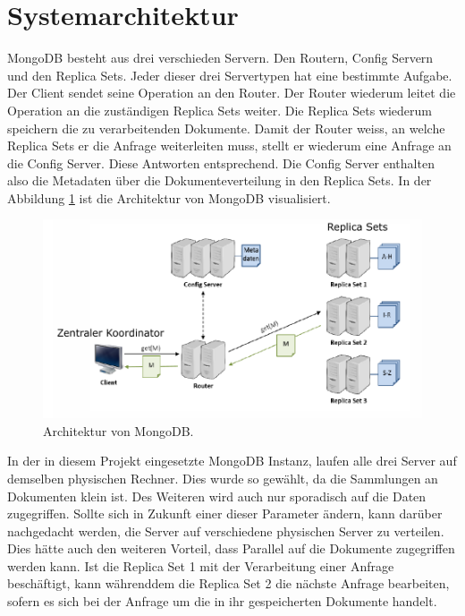  \section{Systemarchitektur}
 MongoDB besteht aus drei verschieden Servern. Den Routern, Config Servern und
 den Replica Sets. Jeder dieser drei Servertypen hat eine bestimmte Aufgabe.
 Der Client sendet seine Operation an den Router. Der Router wiederum leitet
 die Operation an die zuständigen Replica Sets weiter. Die Replica Sets wiederum 
 speichern die zu verarbeitenden Dokumente. Damit der Router weiss, an welche
 Replica Sets er die Anfrage weiterleiten muss, stellt er wiederum eine Anfrage
 an die Config Server. Diese Antworten entsprechend. Die Config Server enthalten 
 also die Metadaten über die Dokumenteverteilung in den Replica Sets.
 In der Abbildung \ref{fig:archmong} ist die Architektur von MongoDB
 visualisiert.
  \begin{figure}[htbp]
  \centering
     \includegraphics[width=1\textwidth]{./pictures/Architektur_MongoDB.png}
  \caption{Architektur von MongoDB. \cite{Kaufmann2016_DB}}
  \label{fig:archmong}
\end{figure}
 In der in diesem Projekt eingesetzte MongoDB Instanz, laufen alle drei Server
 auf demselben physischen Rechner. Dies wurde so gewählt, da die Sammlungen an
 Dokumenten klein ist. Des Weiteren wird auch nur sporadisch auf die Daten
 zugegriffen. Sollte sich in Zukunft einer dieser Parameter ändern, kann darüber
 nachgedacht werden, die Server auf verschiedene physischen Server zu
 verteilen. Dies hätte auch den weiteren Vorteil, dass Parallel auf die
 Dokumente zugegriffen werden kann. Ist die Replica Set 1 mit der Verarbeitung
 einer Anfrage beschäftigt, kann währenddem die Replica Set 2 die nächste
 Anfrage bearbeiten, sofern es sich bei der Anfrage um die in ihr gespeicherten
 Dokumente handelt. \\
